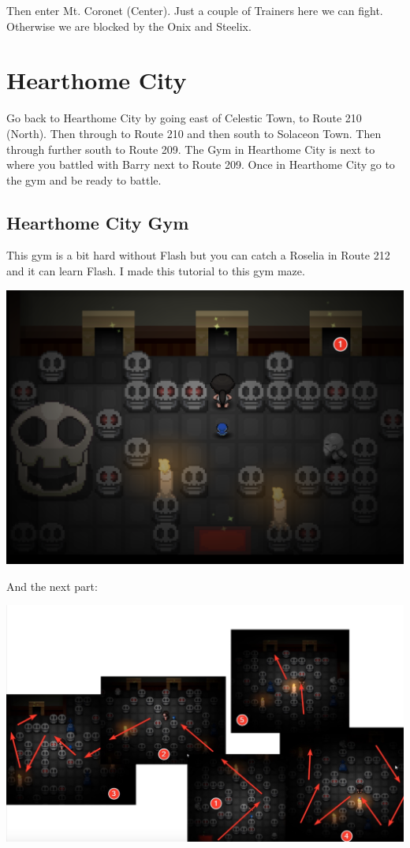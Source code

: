 \documentclass[11pt]{article}
\begin{document}
Then enter Mt. Coronet (Center).
Just a couple of Trainers here we can fight.
Otherwise we are blocked by the Onix and Steelix.



\section{Hearthome City}\label{sec:hearthome-city}
Go back to Hearthome City by going east of Celestic Town, to Route 210 (North).
Then through to Route 210 and then south to Solaceon Town.
Then through further south to Route 209.
The Gym in Hearthome City is next to where you battled with Barry next to Route 209.
Once in Hearthome City go to the gym and be ready to battle.

\subsection{Hearthome City Gym}\label{subsec:hearthome-city-gym}
This gym is a bit hard without Flash but you can catch a Roselia in Route 212
and it can learn Flash.
I made this tutorial to this gym maze.

\includegraphics[width=\textwidth]{walkthrough/Sinnoh/hearthome_gym_1}

And the next part:

\includegraphics[width=\textwidth]{walkthrough/Sinnoh/hearthome_gym_2}
\end{document}

